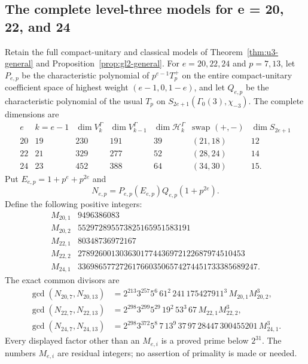 \subsection{The complete level-three models for e = 20, 22, and 24}
\label{sec:u3-higher3}

\begin{proposition}
\label{prop:hecke-higher3}
Retain the full compact-unitary and classical models of
Theorem~\ref{thm:u3-general} and Proposition~\ref{prop:gl2-general}.
For \(e=20,22,24\) and \(p=7,13\), let \(P_{e,p}\) be the
characteristic polynomial of \(p^{e-1}T_p^+\) on the entire
compact-unitary coefficient space of highest weight
\((e-1,0,1-e)\), and let \(Q_{e,p}\) be the characteristic
polynomial of the usual \(T_p\) on
\(S_{2e+1}(\Gamma_0(3),\chi_{-3})\).
The complete dimensions are
\[
\begin{array}{c|c|r|r|r|c|r}
e&k=e-1&\dim V_k^\Gamma&\dim V_{k-1}^\Gamma&
\dim\mathcal H_k^\Gamma&\text{swap }(+,-)&
\dim S_{2e+1}\\ \hline
20&19&230&191&39&(21,18)&12\\
22&21&329&277&52&(28,24)&14\\
24&23&452&388&64&(34,30)&15 .
\end{array}
\tag{HH3.1}
\]
Put \(E_{e,p}=1+p^e+p^{2e}\) and
\[
 N_{e,p}=P_{e,p}(E_{e,p})Q_{e,p}(1+p^{2e}).
 \tag{HH3.2}
\]
Define the following positive integers:
\[
\begin{array}{c|r}
M_{20,1}&9496386083\\
M_{20,2}&552972895573825165951583191\\
M_{22,1}&80348736972167\\
M_{22,2}&2789260013036301774436972122687974510453\\
M_{24,1}&3369865772726176603506574274451733385689247 .
\end{array}
\tag{HH3.3}
\]
The exact common divisors are
\[
\begin{aligned}
\gcd(N_{20,7},N_{20,13})
 &=2^{213}3^{257}5^6\,61^2\,241\,175427911^3\,
        M_{20,1}M_{20,2}^3,\\
\gcd(N_{22,7},N_{22,13})
 &=2^{298}3^{299}5^{29}\,19^2\,53^3\,67\,
        M_{22,1}M_{22,2}^3,\\
\gcd(N_{24,7},N_{24,13})
 &=2^{298}3^{372}5^8\,7\,13^9\,37\,97\,28447\,
        300455201\,M_{24,1}^3 .
\end{aligned}
\tag{HH3.4}
\]
Every displayed factor other than an \(M_{e,i}\) is a proved
prime below \(2^{31}\).
The numbers \(M_{e,i}\) are residual integers; no assertion
of primality is made or needed.
\end{proposition}

